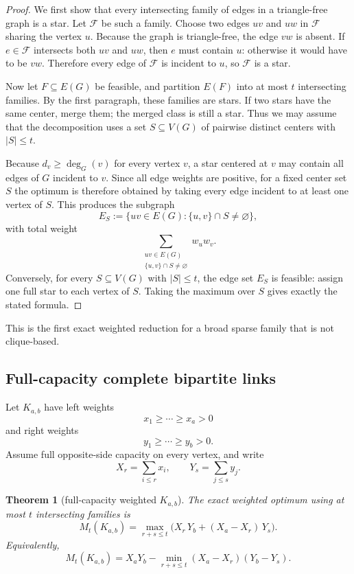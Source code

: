 \documentclass[11pt]{article}
\newtheorem{theorem}{Theorem}[section]
\theoremstyle{definition}
\begin{document}
\begin{proof}
We first show that every intersecting family of edges in a triangle-free graph is a star. Let \(\mathcal F\) be such a family. Choose two edges \(uv\) and \(uw\) in \(\mathcal F\) sharing the vertex \(u\). Because the graph is triangle-free, the edge \(vw\) is absent. If \(e\in\mathcal F\) intersects both \(uv\) and \(uw\), then \(e\) must contain \(u\): otherwise it would have to be \(vw\). Therefore every edge of \(\mathcal F\) is incident to \(u\), so \(\mathcal F\) is a star.

Now let \(F\subseteq E(G)\) be feasible, and partition \(E(F)\) into at most \(t\) intersecting families. By the first paragraph, these families are stars. If two stars have the same center, merge them; the merged class is still a star. Thus we may assume that the decomposition uses a set \(S\subseteq V(G)\) of pairwise distinct centers with \(|S|\le t\).

Because \(d_v\ge \deg_G(v)\) for every vertex \(v\), a star centered at \(v\) may contain all edges of \(G\) incident to \(v\). Since all edge weights are positive, for a fixed center set \(S\) the optimum is therefore obtained by taking every edge incident to at least one vertex of \(S\). This produces the subgraph
\[
E_S:=\{uv\in E(G): \{u,v\}\cap S\neq\varnothing\},
\]
with total weight
\[
\sum_{\substack{uv\in E(G)\\ \{u,v\}\cap S\neq\varnothing}} w_uw_v.
\]
Conversely, for every \(S\subseteq V(G)\) with \(|S|\le t\), the edge set \(E_S\) is feasible: assign one full star to each vertex of \(S\). Taking the maximum over \(S\) gives exactly the stated formula.
\end{proof}

This is the first exact weighted reduction for a broad sparse family that is not clique-based.

\subsection{Full-capacity complete bipartite links}
Let \(K_{a,b}\) have left weights
\[
x_1\ge \cdots \ge x_a>0
\]
and right weights
\[
y_1\ge \cdots \ge y_b>0.
\]
Assume full opposite-side capacity on every vertex, and write
\[
X_r=\sum_{i\le r}x_i,
\qquad
Y_s=\sum_{j\le s}y_j.
\]

\begin{theorem}[full-capacity weighted \(K_{a,b}\)]\label{thm:full-bip}
The exact weighted optimum using at most \(t\) intersecting families is
\[
M_t(K_{a,b})=
\max_{r+s\le t}
\Big(
X_r\,Y_b+(X_a-X_r)\,Y_s
\Big).
\]
Equivalently,
\[
M_t(K_{a,b})=X_aY_b-\min_{r+s\le t}(X_a-X_r)(Y_b-Y_s).
\]
\end{theorem}
\end{document}

